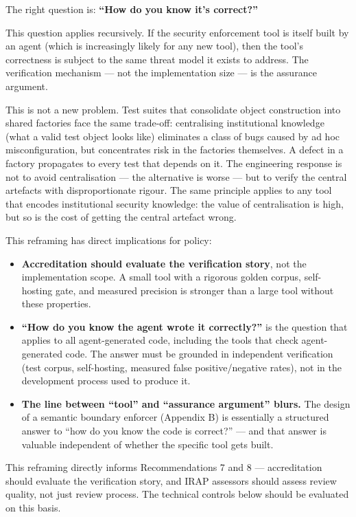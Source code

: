 \documentclass[a4paper,11pt]{report}
\providecommand{\tightlist}{%
  \setlength{\itemsep}{0pt}\setlength{\parskip}{0pt}}
\begin{document}
The right question is: \textbf{``How do you know it's correct?''}

This question applies recursively. If the security enforcement tool is
itself built by an agent (which is increasingly likely for any new
tool), then the tool's correctness is subject to the same threat model
it exists to address. The verification mechanism --- not the
implementation size --- is the assurance argument.

This is not a new problem. Test suites that consolidate object
construction into shared factories face the same trade-off: centralising
institutional knowledge (what a valid test object looks like) eliminates
a class of bugs caused by ad hoc misconfiguration, but concentrates risk
in the factories themselves. A defect in a factory propagates to every
test that depends on it. The engineering response is not to avoid
centralisation --- the alternative is worse --- but to verify the
central artefacts with disproportionate rigour. The same principle
applies to any tool that encodes institutional security knowledge: the
value of centralisation is high, but so is the cost of getting the
central artefact wrong.

This reframing has direct implications for policy:

\begin{itemize}
\tightlist
\item
  \textbf{Accreditation should evaluate the verification story}, not the
  implementation scope. A small tool with a rigorous golden corpus,
  self-hosting gate, and measured precision is stronger than a large
  tool without these properties.
\item
  \textbf{``How do you know the agent wrote it correctly?''} is the
  question that applies to all agent-generated code, including the tools
  that check agent-generated code. The answer must be grounded in
  independent verification (test corpus, self-hosting, measured false
  positive/negative rates), not in the development process used to
  produce it.
\item
  \textbf{The line between ``tool'' and ``assurance argument'' blurs.}
  The design of a semantic boundary enforcer (Appendix B) is essentially
  a structured answer to ``how do you know the code is correct?'' ---
  and that answer is valuable independent of whether the specific tool
  gets built.
\end{itemize}

This reframing directly informs Recommendations 7 and 8 ---
accreditation should evaluate the verification story, and IRAP assessors
should assess review quality, not just review process. The technical
controls below should be evaluated on this basis.
\end{document}

